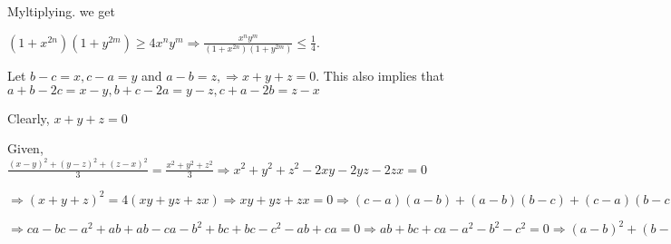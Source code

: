   Myltiplying. we get

  $(1 + x^{2n})(1 + y^{2m})\geq 4x^ny^m\Rightarrow \frac{x^ny^m}{(1 + x^{2n})(1 + y^{2m})}\leq \frac{1}{4}$.
\item Let $b - c = x, c - a = y$ and $a - b = z,\Rightarrow x + y + z = 0.$ This also implies that $a + b - 2c = x -
  y, b + c - 2a = y - z, c + a - 2b = z - x$

  Clearly, $x + y + z = 0$

  Given, $\frac{(x - y)^2 + (y - z)^2 + (z - x)^2}{3} = \frac{x^2 + y^2 + z^2}{3} \Rightarrow x^2 + y^2 +
  z^2 - 2xy - 2yz - 2zx = 0$

  $\Rightarrow (x + y + z)^2 = 4(xy + yz + zx)\Rightarrow xy + yz + zx = 0\Rightarrow (c - a)(a - b) + (a -
  b)(b - c) + (c - a)(b - c) = 0$

  $\Rightarrow ca - bc - a^2 + ab + ab - ca - b^2 + bc + bc - c^2 - ab + ca = 0\Rightarrow ab + bc + ca -
  a^2 - b^2 - c^2 = 0\Rightarrow (a - b)^2 + (b - c)^2 + (c - a)^2 = 0\Rightarrow a = b = c$
\stopitemize
